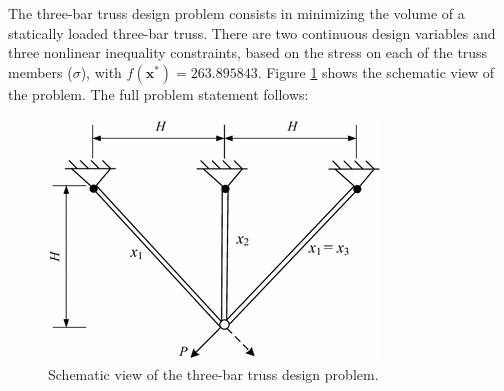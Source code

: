 

The three-bar truss design problem \citep{TB} consists in minimizing the volume of a statically loaded three-bar truss. There are two continuous design variables and three nonlinear inequality constraints, based on the stress on each of the truss members ($\sigma$), with $f(\bm{x}^*) = 263.895843$. Figure \ref{fig:TB} shows the schematic view of the problem. The full problem statement follows:

\vspace{-0.5cm}



\vspace{0.5cm}


\begin{figure}[h]
    \begin{center}
    \includegraphics[scale=0.5]{img/Problems/TB.png}
    \end{center}
    \captionsetup{justification=centering}
    \caption{Schematic view of the three-bar truss design problem.}\label{fig:TB}
\end{figure}
